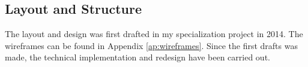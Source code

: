 	\subsection{Layout and Structure}

    The layout and design was first drafted in my specialization project in 2014. The wireframes can be found in Appendix \ref{ap:wireframes}. Since the first drafts was made, the technical implementation and redesign have been carried out. 

    \begin{figure}[H]
      \centering
\end{figure}
